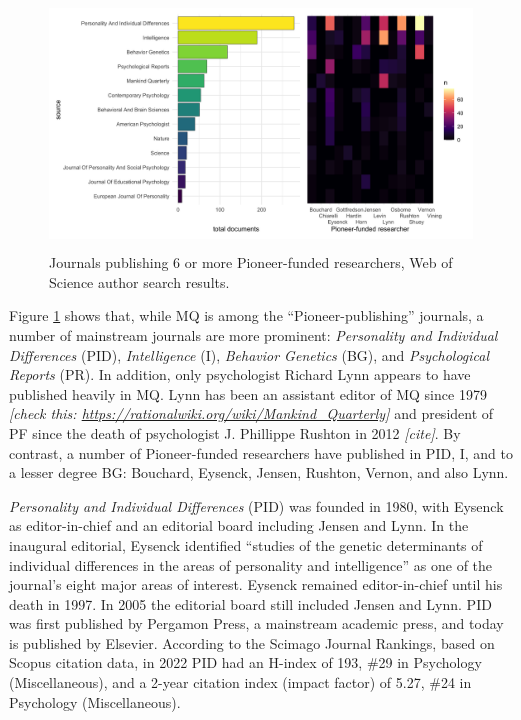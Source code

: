 \documentclass[12pt]{article}
\begin{document}
\begin{figure}
\centering
\includegraphics[width=4.76in,height=2.6in]{img/wos_results.png}
\caption{Journals publishing 6 or more Pioneer-funded researchers, Web of Science author search results. \label{fig:wos}}
\end{figure}

Figure \ref{fig:wos} shows that, while MQ is among the ``Pioneer-publishing'' journals, a number of mainstream journals are more prominent: \emph{Personality and Individual Differences} (PID), \emph{Intelligence} (I), \emph{Behavior Genetics} (BG), and \emph{Psychological Reports} (PR). In addition, only psychologist Richard Lynn appears to have published heavily in MQ. Lynn has been an assistant editor of MQ since 1979 \emph{{[}check this: \url{https://rationalwiki.org/wiki/Mankind_Quarterly}{]}} and president of PF since the death of psychologist J. Phillippe Rushton in 2012 \emph{{[}cite{]}}. By contrast, a number of Pioneer-funded researchers have published in PID, I, and to a lesser degree BG: Bouchard, Eysenck, Jensen, Rushton, Vernon, and also Lynn.

\emph{Personality and Individual Differences} (PID) was founded in 1980, with Eysenck as editor-in-chief and an editorial board including Jensen and Lynn. In the inaugural editorial, Eysenck identified ``studies of the genetic determinants of individual differences in the areas of personality and intelligence'' as one of the journal's eight major areas of interest. Eysenck remained editor-in-chief until his death in 1997. In 2005 the editorial board still included Jensen and Lynn. PID was first published by Pergamon Press, a mainstream academic press, and today is published by Elsevier. According to the Scimago Journal Rankings, based on Scopus citation data, in 2022 PID had an H-index of 193, \#29 in Psychology (Miscellaneous), and a 2-year citation index (impact factor) of 5.27, \#24 in Psychology (Miscellaneous).
\end{document}
